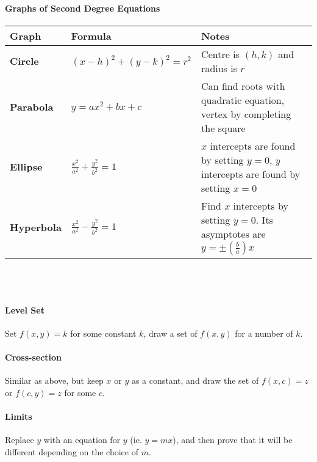\documentclass[10pt,letter]{article}
\theoremstyle{plain}
\theoremstyle{definition}
\begin{document}
\paragraph{Graphs of Second Degree Equations}\mbox{}\newline

\begin{tabular}{|p{2cm}|p{4cm}|p{7cm}|}\\
\hline
\textbf{Graph}     & \textbf{Formula} & \textbf{Notes} \\ \hline
\textbf{Circle}    & $(x-h)^2+(y-k)^2=r^2$               & Centre is $(h,k)$ and radius is $r$  \\\hline
\textbf{Parabola}  & $y=ax^2+bx+c$                       & Can find roots with quadratic equation, vertex by completing the square\\\hline   
\textbf{Ellipse}   & $\frac{x^2}{a^2}+\frac{y^2}{b^2}=1$ & $x$ intercepts are found by setting $y=0$, $y$ intercepts are found by setting $x=0$\\\hline
\textbf{Hyperbola} & $\frac{x^2}{a^2}-\frac{y^2}{b^2}=1$ & Find $x$ intercepts by setting $y=0$. Its asymptotes are $y=\pm\left(\frac{b}{a}\right)x$  \\
\hline
\end{tabular}\\ \\
\paragraph{Level Set} Set $f(x,y)=k$ for some constant $k$, draw a set of $f(x,y)$ for a number of $k$.
\paragraph{Cross-section} Similar as above, but keep $x$ or $y$ as a constant, and draw the set of $f(x,c)=z$ or $f(c,y)=z$ for some $c$. 
\paragraph{Limits} Replace $y$ with an equation for $y$ (ie. $y=mx$), and then prove that it will be different depending on the choice of $m$. 
\end{document}

